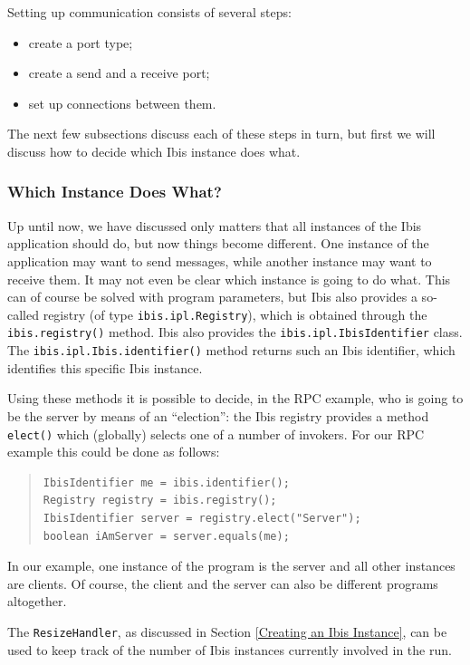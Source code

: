 \documentclass[10pt]{article}
\newcommand{\mysubsubsection}[1]{\subsubsection{#1}\label{#1}}
\begin{document}
Setting up communication consists of several steps:
\begin{itemize}
\item
create a port type;
\item
create a send and a receive port;
\item
set up connections between them.
\end{itemize}

\noindent
The next few subsections discuss each of these steps in turn, but
first we will discuss how to decide which Ibis instance does what.

\mysubsubsection{Which Instance Does What?}

Up until now, we have discussed only matters that all instances of
the Ibis application should do, but now things become different.
One instance of the application may want to send messages, while
another instance may want to receive them.
It may not even be clear which instance is going to do what.
This can of course be solved with program parameters, but Ibis
also provides a so-called registry (of type
\texttt{ibis.ipl.Registry}), which is obtained through the
\texttt{ibis.registry()} method.
Ibis also provides the \texttt{ibis.ipl.IbisIdentifier} class.
The \texttt{ibis.ipl.Ibis.identifier()} method returns such an
Ibis identifier, which identifies this specific Ibis instance.

Using these methods it is possible to decide, in the RPC example,
who is going to be the server by means of an ``election'': the Ibis
registry provides a method \texttt{elect()} which (globally) selects
one of a number of invokers.  For our RPC example this could be done as
follows:

\begin{quote}
\begin{verbatim}
IbisIdentifier me = ibis.identifier();
Registry registry = ibis.registry();
IbisIdentifier server = registry.elect("Server");
boolean iAmServer = server.equals(me);
\end{verbatim}
\end{quote}

In our example, one instance of the program is the server and all
other instances are clients.  Of course, the client and the server can also
be different programs altogether.

The \texttt{ResizeHandler}, as discussed in Section
\ref{Creating an Ibis Instance}, can be used to keep track of the number
of Ibis instances currently involved in the run.
\end{document}
